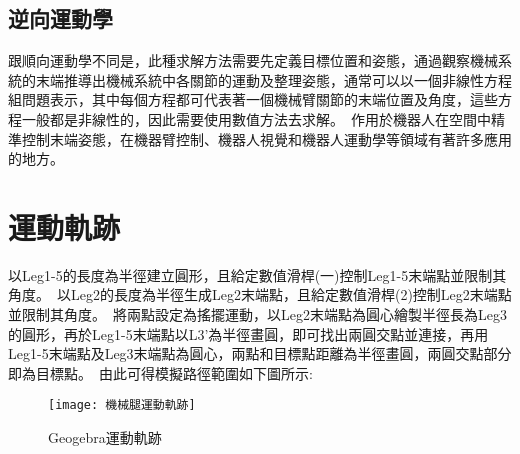 \subsection{逆向運動學}
跟順向運動學不同是，此種求解方法需要先定義目標位置和姿態，通過觀察機械系統的末端推導出機械系統中各關節的運動及整理姿態，通常可以以一個非線性方程組問題表示，其中每個方程都可代表著一個機械臂關節的末端位置及角度，這些方程一般都是非線性的，因此需要使用數值方法去求解。\
作用於機器人在空間中精準控制末端姿態，在機器臂控制、機器人視覺和機器人運動學等領域有著許多應用的地方。\\

\section{運動軌跡}
以Leg1-5的長度為半徑建立圓形，且給定數值滑桿(一)控制Leg1-5末端點並限制其角度。\
以Leg2的長度為半徑生成Leg2末端點，且給定數值滑桿(2)控制Leg2末端點並限制其角度。\
將兩點設定為搖擺運動，以Leg2末端點為圓心繪製半徑長為Leg3的圓形，再於Leg1-5末端點以L3’為半徑畫圓，即可找出兩圓交點並連接，再用Leg1-5末端點及Leg3末端點為圓心，兩點和目標點距離為半徑畫圓，兩圓交點部分即為目標點。\
由此可得模擬路徑範圍如下圖所示:\\
\begin{figure}[hbt!]
\begin{center}
\texttt{[image: 機械腿運動軌跡]}
\caption{\Large Geogebra運動軌跡}\label{機械腿運動軌跡}
\end{center}
\end{figure}
\newpage

